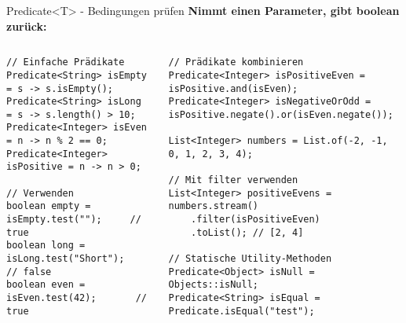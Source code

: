 \begin{frame}[fragile]{Predicate<T> - Bedingungen prüfen}
  \textbf{Nimmt einen Parameter, gibt boolean zurück:}

  \begin{columns}[T]
    \begin{lstlisting}[style=java, basicstyle=\tiny\ttfamily]
// Einfache Prädikate
Predicate<String> isEmpty = s -> s.isEmpty();
Predicate<String> isLong = s -> s.length() > 10;
Predicate<Integer> isEven = n -> n % 2 == 0;
Predicate<Integer> isPositive = n -> n > 0;

// Verwenden
boolean empty = isEmpty.test("");     // true
boolean long = isLong.test("Short");   // false
boolean even = isEven.test(42);       // true
    \end{lstlisting}

    \begin{lstlisting}[style=java, basicstyle=\tiny\ttfamily]
// Prädikate kombinieren
Predicate<Integer> isPositiveEven = isPositive.and(isEven);
Predicate<Integer> isNegativeOrOdd = isPositive.negate().or(isEven.negate());

List<Integer> numbers = List.of(-2, -1, 0, 1, 2, 3, 4);

// Mit filter verwenden
List<Integer> positiveEvens = numbers.stream()
    .filter(isPositiveEven)
    .toList(); // [2, 4]

// Statische Utility-Methoden
Predicate<Object> isNull = Objects::isNull;
Predicate<String> isEqual = Predicate.isEqual("test");
    \end{lstlisting}
  \end{columns}
\end{frame}

